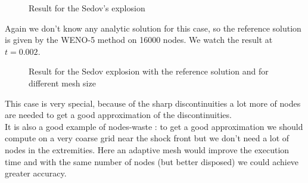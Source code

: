\begin{figure}[!h]
\hspace{-1.3cm}
\begin{minipage}{.5\linewidth}
\centering
{}
\end{minipage}
\hfill
\begin{minipage}{.5\linewidth}
\centering
{}
\end{minipage}
\vspace{0.5cm}
\hspace{-1.3cm}
\begin{minipage}{.5\linewidth}
\centering
{}
\end{minipage}
\hfill
\begin{minipage}{.5\linewidth}
\centering
{} 
\end{minipage}
\caption{\label{fig:sedovResult}Result for the Sedov's explosion}
\end{figure}

\newpage

Again we don't know any analytic solution for this case, so the reference solution is given by the WENO-5 method on 16000 nodes. We watch the result at $t=0.002$.

\begin{figure}[H]
\hspace{-1.3cm}
\begin{minipage}{.5\linewidth}
\centering
{}
\end{minipage}
\hfill
\begin{minipage}{.5\linewidth}
\centering
{}
\end{minipage}
\vspace{0.5cm}
\hspace{-1.3cm}
\begin{minipage}{.5\linewidth}
\centering
{}
\end{minipage}
\hfill
\begin{minipage}{.5\linewidth}
\centering
{} 
\end{minipage}
\caption{Result for the Sedov explosion with the reference solution and for different mesh size}
\end{figure}
This case is very special, because of the sharp discontinuities a lot more of nodes are needed to get a good approximation of the discontinuities. \\
It is also a good example of nodes-waste : to get a good approximation we should compute on a very coarse grid near the shock front but we don't need a lot of nodes in the extremities. Here an adaptive mesh would improve the execution time and with the same number of nodes (but better disposed) we could achieve greater accuracy.